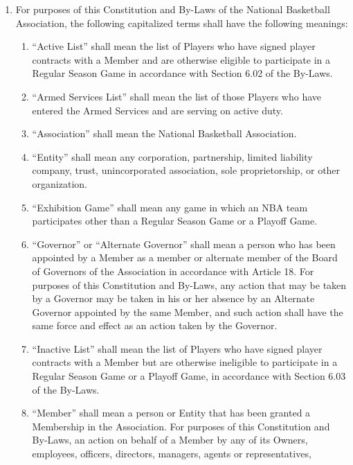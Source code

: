 \documentclass[]{book}
\providecommand{\tightlist}{%
  \setlength{\itemsep}{0pt}\setlength{\parskip}{0pt}}
\theoremstyle{definition}
\theoremstyle{definition}
\theoremstyle{definition}
\theoremstyle{remark}
\begin{document}
\begin{enumerate}
\def\labelenumi{(\alph{enumi})}
\tightlist
\item
  For purposes of this Constitution and By-Laws of the National
  Basketball Association, the following capitalized terms shall have the
  following meanings:

  \begin{enumerate}
  \def\labelenumii{(\arabic{enumii})}
  \tightlist
  \item
    ``Active List'' shall mean the list of Players who have signed
    player contracts with a Member and are otherwise eligible to
    participate in a Regular Season Game in accordance with Section 6.02
    of the By-Laws.
  \item
    ``Armed Services List'' shall mean the list of those Players who
    have entered the Armed Services and are serving on active duty.
  \item
    ``Association'' shall mean the National Basketball Association.
  \item
    ``Entity'' shall mean any corporation, partnership, limited
    liability company, trust, unincorporated association, sole
    proprietorship, or other organization.
  \item
    ``Exhibition Game'' shall mean any game in which an NBA team
    participates other than a Regular Season Game or a Playoff Game.
  \item
    ``Governor'' or ``Alternate Governor'' shall mean a person who has
    been appointed by a Member as a member or alternate member of the
    Board of Governors of the Association in accordance with Article 18.
    For purposes of this Constitution and By-Laws, any action that may
    be taken by a Governor may be taken in his or her absence by an
    Alternate Governor appointed by the same Member, and such action
    shall have the same force and effect as an action taken by the
    Governor.
  \item
    ``Inactive List'' shall mean the list of Players who have signed
    player contracts with a Member but are otherwise ineligible to
    participate in a Regular Season Game or a Playoff Game, in
    accordance with Section 6.03 of the By-Laws.
  \item
    ``Member'' shall mean a person or Entity that has been granted a
    Membership in the Association. For purposes of this Constitution and
    By-Laws, an action on behalf of a Member by any of its Owners,
    employees, officers, directors, managers, agents or representatives,

\end{enumerate}
\end{enumerate}
\end{document}
